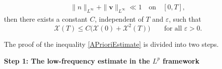 \documentclass{amsart}
\theoremstyle{definition}
\theoremstyle{remark}
\numberwithin{equation}{section}
\def\cX{{\mathcal X}}
\def\bv{{\bm{v} }}
\begin{document}
\begin{equation*}%
\begin{split}
\|n\|_{L^\infty}+\|\bv\|_{L^\infty} \ll 1 \quad \text{on} \quad [0,T],
\end{split}
\end{equation*}
then there exists a constant $C$, independent of $T$ and $\varepsilon$, such that
\begin{equation}\label{APrioriEstimate}
\cX(T)\leq C\big( \cX(0)+\cX^2(T)\big) \qquad\text{for all } \varepsilon>0.
\end{equation}




The proof of the inequality \eqref{APrioriEstimate} is divided into two steps.

\vspace{0.5pc}
{\bf Step 1: The low-frequency estimate in the $L^p$ framework}
\vspace{0.5pc}
\end{document}
